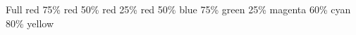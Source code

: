 \documentclass{article}
\begin{document}
\textcolor{red!100}{Full red}
\textcolor{red!75}{75\% red}
\textcolor{red!50}{50\% red}
\textcolor{red!25}{25\% red}
\textcolor{blue!50}{50\% blue}
\textcolor{green!75}{75\% green}
\textcolor{magenta!25}{25\% magenta}
\textcolor{cyan!60}{60\% cyan}
\textcolor{yellow!80}{80\% yellow}


\end{document}
